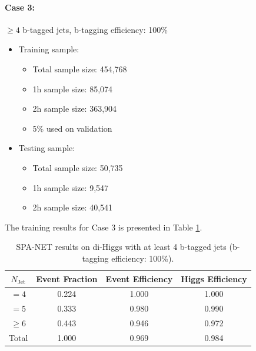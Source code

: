 \documentclass[12pt]{article}
\begin{document}
		\paragraph{Case 3:}$\ge 4$ b-tagged jets, b-tagging efficiency: 100\%
		\begin{itemize}
			\item Training sample:
			\begin{itemize}
				\item Total sample size: 454,768
				\item 1h sample size: 85,074
				\item 2h sample size: 363,904
				\item 5\% used on validation
			\end{itemize}
			\item Testing sample: 
				\begin{itemize}
					\item Total sample size: 50,735
					\item 1h sample size: 9,547
					\item 2h sample size: 40,541
				\end{itemize}
		\end{itemize}
		The training results for Case 3 is presented in Table \ref{tab:SPANet_4btag_100}.
		\begin{table}[htpb]
			\centering
			\caption{SPA-NET results on di-Higgs with at least 4 b-tagged jets (b-tagging efficiency: 100\%).}
			\label{tab:SPANet_4btag_100}
			\begin{tabular}{c|c|cc}
				$N_\text{Jet}$ & Event Fraction & Event Efficiency & Higgs Efficiency \\
				\hline
				$=4$	  &   0.224             &    1.000              &  1.000               \\
				$=5$	  &   0.333             &    0.980              &  0.990               \\
				$\ge 6$	  &   0.443             &    0.946              &  0.972               \\
				Total	  &   1.000             &    0.969              &  0.984               \\
			\end{tabular}
		\end{table}
\end{document}
